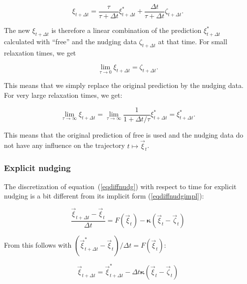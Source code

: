 \begin{appendix}
\begin{equation}\label{eqnumnimpl}
\xi_{t+\Delta t}=\frac{\tau}{\tau+\Delta t}\xi^\ast_{t+\Delta
  t}+\frac{\Delta t}{\tau+\Delta t}\zeta_{t+\Delta t}.
\end{equation}

The new $\xi_{t+\Delta t}$ is therefore a linear combination of the
prediction $\xi^\ast_{t+\Delta t}$ calculated with ``free'' \echam{}
and the nudging data 
$\zeta_{t+\Delta t}$ at that time. For small relaxation
times, we get

\begin{equation}\label{eqlimittau0impl}
\lim\limits_{\tau \rightarrow 0}\xi_{t+\Delta t}=\zeta_{t+\Delta t}.
\end{equation}

This means that we simply replace the original prediction by the
nudging data. For very large relaxation times, we get:

\begin{equation}\label{eqlimittauinfimpl}
\lim\limits_{\tau \rightarrow \infty}\xi_{t+\Delta
  t}=\lim\limits_{\tau\rightarrow\infty}\frac{1}{1+\Delta
  t/\tau}\xi^\ast_{t+\Delta t}=\xi^\ast_{t+\Delta t}.
\end{equation}

This means that the original prediction of free \echam{} is used
and the nudging 
data do not have any influence on the trajectory $t\mapsto\vec{\xi}_t$.

\subsubsection{Explicit nudging}\label{secnudgexpl}

The discretization of equation~(\ref{eqdiffnudg}) with respect to time
for explicit nudging is a bit different from its implicit form
(\ref{eqdiffnudgimpl}): 

\begin{equation}\label{eqdiffnudgexpl}
\frac{\vec{\xi}_{t+\Delta t}-\vec{\xi}_{t}}{\Delta t}
= F(\vec{\xi}_t)-\boldsymbol{\kappa}(\vec{\xi}_{t}-\vec{\zeta}_{t})
\end{equation}

From this follows with $(\vec{\xi}^\ast_{t+\Delta
  t}-\vec{\xi}_t)/\Delta t = F(\vec{\xi}_t)$:

\begin{displaymath}
\vec{\xi}_{t+\Delta t}=\vec{\xi}^\ast_{t+\Delta t}-\Delta t
\boldsymbol{\kappa} \left(\vec{\xi}_t-\vec{\zeta}_t\right)
\end{displaymath}


\end{appendix}
